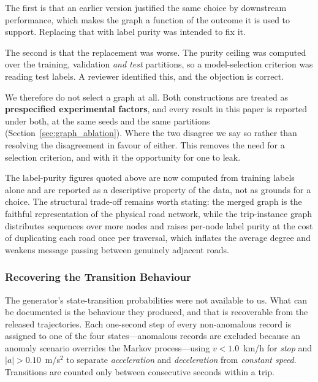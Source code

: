 \documentclass[journal]{IEEEtran}
\begin{document}
The first is that an earlier version justified the same choice by downstream performance, which makes the graph a function of the outcome it is used to support. Replacing that with label purity was intended to fix it.

The second is that the replacement was worse. The purity ceiling was computed over the training, validation \emph{and test} partitions, so a model-selection criterion was reading test labels. A reviewer identified this, and the objection is correct.

We therefore do not select a graph at all. Both constructions are treated as \textbf{prespecified experimental factors}, and every result in this paper is reported under both, at the same seeds and the same partitions (Section~\ref{sec:graph_ablation}). Where the two disagree we say so rather than resolving the disagreement in favour of either. This removes the need for a selection criterion, and with it the opportunity for one to leak.

The label-purity figures quoted above are now computed from training labels alone and are reported as a descriptive property of the data, not as grounds for a choice. The structural trade-off remains worth stating: the merged graph is the faithful representation of the physical road network, while the trip-instance graph distributes sequences over more nodes and raises per-node label purity at the cost of duplicating each road once per traversal, which inflates the average degree and weakens message passing between genuinely adjacent roads.

\subsubsection{Recovering the Transition Behaviour}
\label{sec:markov}
The generator's state-transition probabilities were not available to us. What
can be documented is the behaviour they produced, and that is recoverable from
the released trajectories. Each one-second step of every non-anomalous record
is assigned to one of the four states---anomalous records are excluded because
an anomaly scenario overrides the Markov process---using
$v < 1.0$~km/h for \emph{stop} and
$|a| > 0.10$~m/s$^2$ to separate \emph{acceleration} and
\emph{deceleration} from \emph{constant speed}. Transitions are counted only
between consecutive seconds within a trip.
\end{document}
